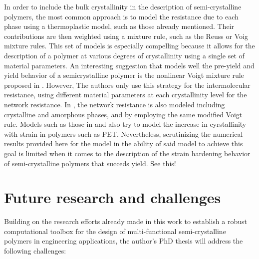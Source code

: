 In order to include the bulk crystallinity in the description of semi-crystalline polymers, the most common approach is to model the resistance due to each phase using a thermoplastic model, such as those already mentioned.
Their contributions are then weighted using a mixture rule, such as the Reuss or Voig mixture rules.
This set of models is especially compelling because it allows for the description of a polymer at various degrees of crystallinity using a single set of material parameters.
An interesting suggestion that models well the pre-yield and yield behavior of a semicrystalline polymer is the nonlinear Voigt mixture rule proposed in \cite{ayoubEffectsCrystalContent2011}.
However, The authors only use this strategy for the intermolecular resistance, using different material parameters at each crystallinity level for the network resistance.
In \cite{abdul-hameedTwophaseHyperelasticviscoplasticConstitutive2014}, the network resistance is also modeled including crystalline and amorphous phases, and by employing the same modified Voigt rule.
Models such as those in \cite{ahziModelingDeformationBehavior2003, makradiTwophaseSelfconsistentModel2005} and \cite{cundiffModelingViscoplasticBehavior2022} also try to model the increase in cyrstallinity with strain in polymers such as PET.
Nevertheless, scrutinizing the numerical results provided here for the model in \citep{abdul-hameedTwophaseHyperelasticviscoplasticConstitutive2014} the ability of said model to achieve this goal is limited when it comes to the description of the strain hardening behavior of semi-crystalline polymers that succeds yield. \colorbox{BrickRed}{See this!}
\enlargethispage{\baselineskip}
\section{Future research and challenges}

Building on the research efforts already made in this work to establish a robust computational toolbox for the design of multi-functional semi-crystalline polymers in engineering applications, the author's PhD thesis will address the following challenges:

